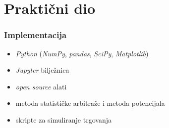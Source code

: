 \documentclass[11pt, notheorems]{beamer}
\begin{document}
  \section{Praktični dio}
  \begin{frame}
    \frametitle{Implementacija}
    \begin{itemize}
      \item \alert{\textit{Python}} (\emph{NumPy}, \emph{pandas}, \emph{SciPy}, \emph{Matplotlib})
      \item \alert{\textit{Jupyter} bilježnica}
      \item \emph{open source} alati
      \item metoda statističke arbitraže i metoda potencijala
      \item skripte za simuliranje trgovanja
    \end{itemize}
  \end{frame}
\end{document}
